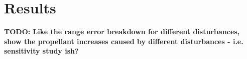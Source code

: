 \documentclass[letterpaper, preprint, paper,11pt]{AAS}
\begin{document}
\section{Results}
\textbf{TODO: Like the range error breakdown for different disturbances, show the propellant increases caused by different disturbances - i.e. sensitivity study ish?}
%
%





\end{document}
